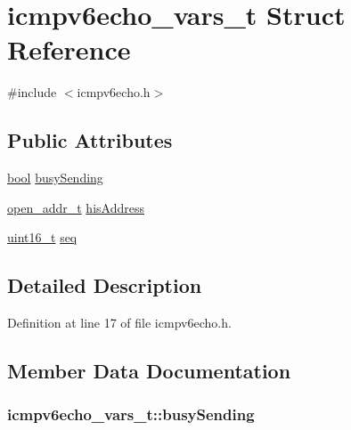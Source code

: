 \hypertarget{structicmpv6echo__vars__t}{}\section{icmpv6echo\+\_\+vars\+\_\+t Struct Reference}
\label{structicmpv6echo__vars__t}


{\ttfamily \#include $<$icmpv6echo.\+h$>$}

\subsection*{Public Attributes}
\begin{DoxyCompactItemize}
\item 
\hyperlink{_p_e___types_8h_a97a80ca1602ebf2303258971a2c938e2}{bool} \hyperlink{structicmpv6echo__vars__t_ab61c1cce8f245d120217f6e0c64d278f}{busy\+Sending}
\item 
\hyperlink{structopen__addr__t}{open\+\_\+addr\+\_\+t} \hyperlink{structicmpv6echo__vars__t_a048b2759f15b3c5deebf931c5dedbe0e}{his\+Address}
\item 
\hyperlink{_p_e___types_8h_a1f1825b69244eb3ad2c7165ddc99c956}{uint16\+\_\+t} \hyperlink{structicmpv6echo__vars__t_a879e3cd4c2b8d5de0dd45a8912a6ba3c}{seq}
\end{DoxyCompactItemize}


\subsection{Detailed Description}


Definition at line 17 of file icmpv6echo.\+h.



\subsection{Member Data Documentation}
\subsubsection[{\texorpdfstring{busy\+Sending}{busySending}}]{ icmpv6echo\+\_\+vars\+\_\+t\+::busy\+Sending}\hypertarget{structicmpv6echo__vars__t_ab61c1cce8f245d120217f6e0c64d278f}{}\label{structicmpv6echo__vars__t_ab61c1cce8f245d120217f6e0c64d278f}


